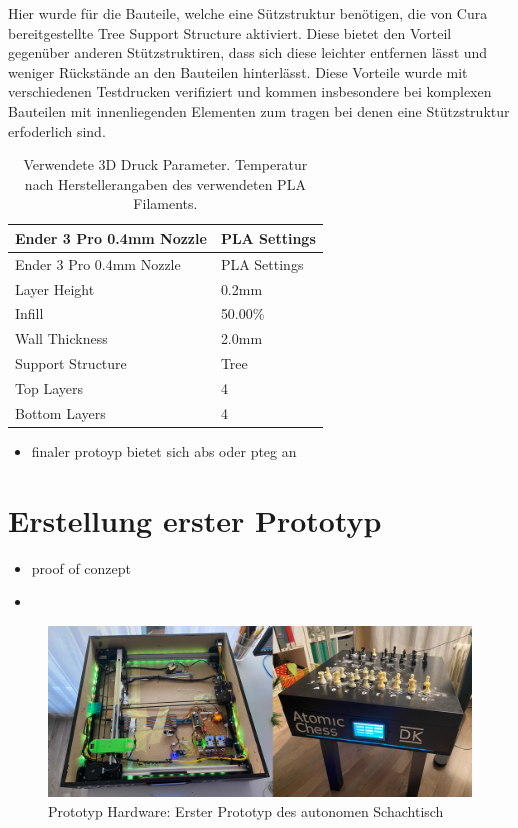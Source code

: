 Hier wurde für die Bauteile, welche eine Sützstruktur benötigen, die von
Cura bereitgestellte Tree Support Structure aktiviert. Diese bietet den
Vorteil gegenüber anderen Stützstruktiren, dass sich diese leichter
entfernen lässt und weniger Rückstände an den Bauteilen hinterlässt.
Diese Vorteile wurde mit verschiedenen Testdrucken verifiziert und
kommen insbesondere bei komplexen Bauteilen mit innenliegenden Elementen
zum tragen bei denen eine Stützstruktur erfoderlich sind.

\begin{longtable}[]{@{}ll@{}}
\caption{Verwendete 3D Druck Parameter. Temperatur nach
Herstellerangaben des verwendeten PLA Filaments.}\tabularnewline
\toprule
Ender 3 Pro 0.4mm Nozzle & PLA Settings\tabularnewline
\midrule
\endfirsthead
\toprule
Ender 3 Pro 0.4mm Nozzle & PLA Settings\tabularnewline
\midrule
\endhead
Layer Height & 0.2mm\tabularnewline
Infill & 50.00\%\tabularnewline
Wall Thickness & 2.0mm\tabularnewline
Support Structure & Tree\tabularnewline
Top Layers & 4\tabularnewline
Bottom Layers & 4\tabularnewline
\bottomrule
\end{longtable}

\begin{itemize}
\tightlist
\item
  finaler protoyp bietet sich abs oder pteg an
\end{itemize}

\hypertarget{erstellung-erster-prototyp}{%
\section{Erstellung erster Prototyp}\label{erstellung-erster-prototyp}}

\begin{itemize}
\item
  proof of conzept
\item
\end{itemize}

\begin{figure}
\centering
\includegraphics{images/table_images/dk.png}
\caption{Prototyp Hardware: Erster Prototyp des autonomen Schachtisch}
\end{figure}

